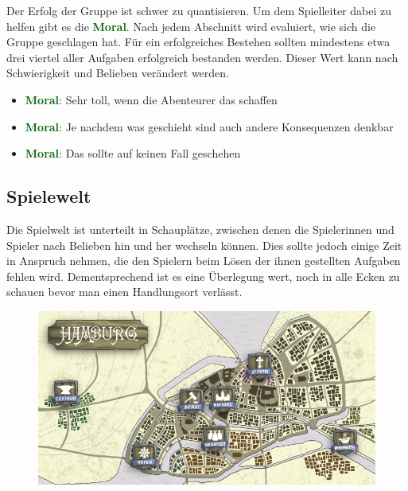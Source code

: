 \newcommand{\Moral}[1][]{\textbf{\textcolor{darkgreen}{Moral\ifthenelse{\equal{#1}{}}{}{$\;(#1)$}}}}

Der Erfolg der Gruppe ist schwer zu quantisieren. Um dem Spielleiter dabei zu helfen
gibt es die \Moral. Nach jedem Abschnitt wird evaluiert, wie sich die Gruppe
geschlagen hat. Für ein erfolgreiches Bestehen sollten mindestens etwa drei viertel
aller Aufgaben erfolgreich bestanden werden. Dieser Wert kann nach Schwierigkeit und
Belieben verändert werden.

\begin{itemize}
\item \Moral[++]: Sehr toll, wenn die Abenteurer das schaffen
\item \Moral[+/0/-]: Je nachdem was geschieht sind auch andere Konsequenzen denkbar
\item \Moral[--]: Das sollte auf keinen Fall geschehen
\end{itemize}

\subsection*{Spielewelt}
\label{ssec:world}

Die Spielwelt ist unterteilt in Schauplätze, zwischen denen die Spielerinnen und
Spieler nach Belieben hin und her wechseln können. Dies sollte jedoch einige Zeit in
Anspruch nehmen, die den Spielern beim Lösen der ihnen gestellten Aufgaben fehlen
wird. Dementsprechend ist es eine Überlegung wert, noch in alle Ecken zu schauen
bevor man einen Handlungsort verlässt.

\begin{landscape}
	\begin{figure}
		\includegraphics[width=0.8\paperheight,height=\textwidth]{./01-img/map.png}
    \label{fig:map}
	\end{figure}

\end{landscape}
